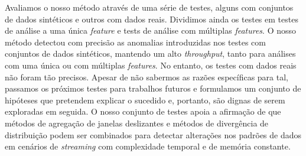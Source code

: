 Avaliamos o nosso método através de uma série de testes, alguns com conjuntos de dados sintéticos e outros com dados reais. Dividimos ainda os testes em testes de análise a uma única \textit{feature} e tests de análise com múltiplas \textit{features}. O nosso método detectou com precisão as anomalias introduzidas nos testes com conjuntos de dados sintéticos, mantendo um alto \textit{throughput}, tanto para análises com uma única ou com múltiplas \textit{features}. No entanto, os testes com dados reais não foram tão precisos. Apesar de não sabermos as razões específicas para tal, passamos os próximos testes para trabalhos futuros e formulamos um conjunto de hipóteses que pretendem explicar o sucedido e, portanto, são dignas de serem exploradas em seguida. O nosso conjunto de testes apoia a afirmação de que métodos de agregação de janelas deslizantes e métodos de divergência de distribuição podem ser combinados para detectar alterações nos padrões de dados em cenários de \textit{streaming} com complexidade temporal e de memória constante.

